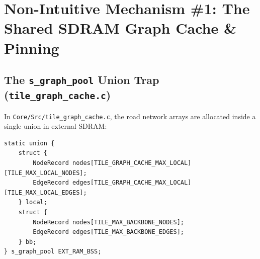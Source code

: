 \documentclass[11pt,a4paper]{article}
\begin{document}
\section{Non-Intuitive Mechanism \#1: The Shared SDRAM Graph Cache \& Pinning}

\subsection{The \texttt{s\_graph\_pool} Union Trap (\texttt{tile\_graph\_cache.c})}

In \texttt{Core/Src/tile\_graph\_cache.c}, the road network arrays are allocated inside a single union in external SDRAM:

\begin{lstlisting}[caption={Shared SDRAM union in \texttt{tile\_graph\_cache.c}}]
static union {
    struct {
        NodeRecord nodes[TILE_GRAPH_CACHE_MAX_LOCAL][TILE_MAX_LOCAL_NODES];
        EdgeRecord edges[TILE_GRAPH_CACHE_MAX_LOCAL][TILE_MAX_LOCAL_EDGES];
    } local;
    struct {
        NodeRecord nodes[TILE_MAX_BACKBONE_NODES];
        EdgeRecord edges[TILE_MAX_BACKBONE_EDGES];
    } bb;
} s_graph_pool EXT_RAM_BSS;
\end{lstlisting}
\end{document}

